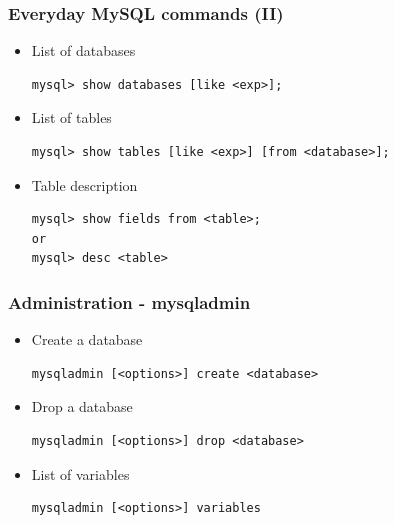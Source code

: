 \documentclass{beamer}
\begin{document}

\begin{frame}[fragile]
\frametitle{Everyday MySQL commands (II)}

\begin{itemize}
\item List of databases
\begin{verbatim}
mysql> show databases [like <exp>];

\end{verbatim}

\item List of tables
\begin{verbatim}
mysql> show tables [like <exp>] [from <database>];

\end{verbatim}

\item Table description
\begin{verbatim}
mysql> show fields from <table>;
or
mysql> desc <table>

\end{verbatim}
\end{itemize}

\end{frame}


\begin{frame}[fragile]
\frametitle{Administration - mysqladmin}

\begin{itemize}
\item Create a database
\begin{verbatim}
mysqladmin [<options>] create <database>

\end{verbatim}

\item Drop a database
\begin{verbatim}
mysqladmin [<options>] drop <database>

\end{verbatim}

\item List of variables
\begin{verbatim}
mysqladmin [<options>] variables

\end{verbatim}
\end{itemize}

\end{frame}
\end{document}
